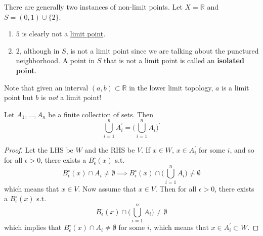   \begin{example}
    \label{ex:examples-of-non-limit-points}
    There are generally two instances of non-limit points. Let $X = \mathbb{R}$ and $S = (0, 1) \cup \{2\}$. 
    \begin{enumerate}
      \item $5$ is clearly not a \hyperref[def:limit-point]{limit point}. 
      \item $2$, although in $S$, is not a limit point since we are talking about the punctured neighborhood. A point in $S$ that is not a limit point is called an \textbf{isolated point}. 
    \end{enumerate}
  \end{example}

  \begin{example}
    \label{ex:counterintuitive-limit-points-in-lower-limit}
    Note that given an interval $(a, b) \subset \mathbb{R}$ in the lower limit topology, $a$ is a limit point but $b$ is \textit{not} a limit point!
  \end{example}

  \begin{theorem}
    \label{thm:union-of-limit-points-is-limit-points-of-union}
    Let $A_1, \ldots, A_n$ be a finite collection of sets. Then 
    \begin{equation}
      \bigcup_{i=1}^n A_i^\prime = \bigg( \bigcup_{i=1}^n A_i \bigg)^\prime
    \end{equation}
  \end{theorem}
  \begin{proof}
    Let the LHS be $W$ and the RHS be $V$. If $x \in W$, $x \in A_i^\prime$ for some $i$, and so for all $\epsilon > 0$, there exists a $B_\epsilon^\circ (x)$ s.t. 
    \begin{equation}
      B_\epsilon^\circ (x) \cap A_i \neq \emptyset \implies B_\epsilon^\circ (x) \cap \bigg( \bigcup_{i=1}^n A_i \bigg) \neq \emptyset
    \end{equation}
    which means that $x \in V$. Now assume that $x \in V$. Then for all $\epsilon > 0$, there exists a $B_\epsilon^\circ (x)$ s.t. 
    \begin{equation}
      B_\epsilon^\circ (x) \cap \bigg( \bigcup_{i=1}^n A_i \bigg) \neq \emptyset
    \end{equation}
    which implies that $B_\epsilon^\circ (x) \cap A_i \neq \emptyset$ for some $i$, which means that $x \in A_i^\prime \subset W$. 
  \end{proof}

